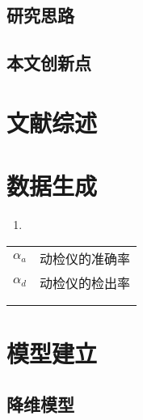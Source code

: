\documentclass[a4paper]{article}
\begin{document}
	\subsection{研究思路}
	\subsection{本文创新点}
	
	\section{文献综述}
	\subsection{}
	
	
	
	\section{数据生成}
	\begin{enumerate} 
		\item 
	\end{enumerate}
	
	\begin{table}[H] %
		\captionsetup{skip=4pt} %
		\centering
		\setlength{\arrayrulewidth}{2pt} %
		\begin{tabular}{cc} %
			\hline
			\makebox[0.15\textwidth][c]{符号} & \makebox[0.8\textwidth][c]{说明}  \\ 
			\hline
			$\alpha_a$ & 动检仪的准确率  \\
			$\alpha_d$ & 动检仪的检出率   \\
			$$ &   \\
			&   \\
			\hline
		\end{tabular}
	\end{table}
	
	
	\section{模型建立}
	\subsection{降维模型}	
\end{document}
